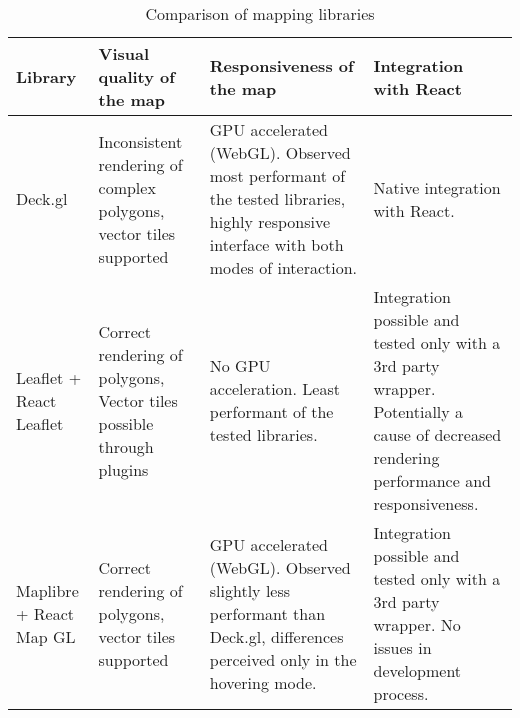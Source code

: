 \begin{table}[H]
	\caption{Comparison of mapping libraries}
	\label{tab:map library comparison}
	\centering
	\begin{tabular}{ | L{0.13\textwidth} | L{0.25\textwidth} | L{0.25\textwidth} | L{0.25\textwidth} | }
		\hline
		\textbf{Library}
		& \textbf{Visual quality of the map}
		& \textbf{Responsiveness of the map}
		& \textbf{Integration with React}
		\\
		\hline
		\hline
		Deck.gl
		& Inconsistent rendering of complex polygons, vector tiles supported
		& GPU accelerated (WebGL).
		Observed most performant of the tested libraries,
		highly responsive interface with both modes of interaction.
		& Native integration with React.
		\\
		\hline
		Leaflet + React Leaflet
		& Correct rendering of polygons, Vector tiles possible through plugins
		& No GPU acceleration. Least performant of the tested libraries.
		& Integration possible and tested only with a 3rd party wrapper.
		Potentially a cause of decreased rendering performance and responsiveness.
		\\
		\hline
		Maplibre + React Map GL
		& Correct rendering of polygons, vector tiles supported
		& GPU accelerated (WebGL).
		Observed slightly less performant than Deck.gl,
		differences perceived only in the hovering mode.
		& Integration possible and tested only with a 3rd party wrapper.
		No issues in development process.
		\\
		\hline
	\end{tabular}
\end{table}
